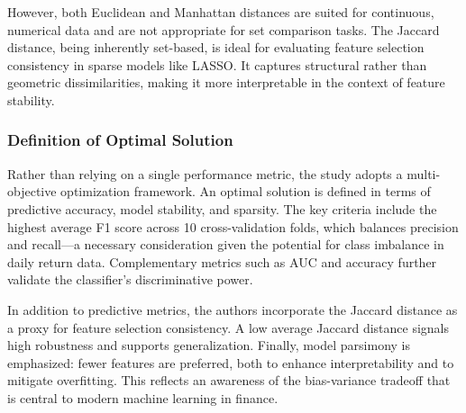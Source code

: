 However, both Euclidean and Manhattan distances are suited for continuous, numerical data and are not appropriate for set comparison tasks. The Jaccard distance, being inherently set-based, is ideal for evaluating feature selection consistency in sparse models like LASSO. It captures structural rather than geometric dissimilarities, making it more interpretable in the context of feature stability.

\subsubsection{Definition of Optimal Solution}

Rather than relying on a single performance metric, the study adopts a multi-objective optimization framework. An optimal solution is defined in terms of predictive accuracy, model stability, and sparsity. The key criteria include the highest average F1 score across 10 cross-validation folds, which balances precision and recall—a necessary consideration given the potential for class imbalance in daily return data. Complementary metrics such as AUC and accuracy further validate the classifier’s discriminative power.

In addition to predictive metrics, the authors incorporate the Jaccard distance as a proxy for feature selection consistency. A low average Jaccard distance signals high robustness and supports generalization. Finally, model parsimony is emphasized: fewer features are preferred, both to enhance interpretability and to mitigate overfitting. This reflects an awareness of the bias-variance tradeoff that is central to modern machine learning in finance.

